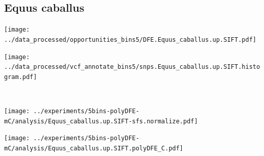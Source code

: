 \subsection{Equus caballus}

\begin{minipage}{0.49\linewidth}
    \texttt{[image: ../data\_processed/opportunities\_bins5/DFE.Equus\_caballus.up.SIFT.pdf]}
\end{minipage}
\begin{minipage}{0.49\linewidth}
    \texttt{[image: ../data\_processed/vcf\_annotate\_bins5/snps.Equus\_caballus.up.SIFT.histogram.pdf]}
\end{minipage}
\\
\begin{minipage}{0.49\linewidth}
    \texttt{[image: ../experiments/5bins-polyDFE-mC/analysis/Equus\_caballus.up.SIFT-sfs.normalize.pdf]}
\end{minipage}
\begin{minipage}{0.4\linewidth}
    \texttt{[image: ../experiments/5bins-polyDFE-mC/analysis/Equus\_caballus.up.SIFT.polyDFE\_C.pdf]}
\end{minipage}
